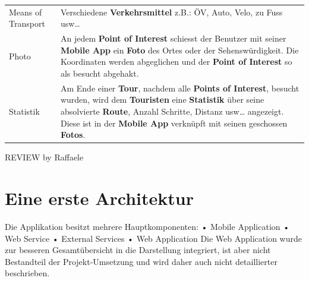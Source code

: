 \documentclass[a4paper,10pt,xetex]{article}
\begin{document}
\begin{longtable}[]{@{}ll@{}}
\begin{minipage}[t]{0.08\columnwidth}\raggedright\strut
Means of Transport\strut
\end{minipage} & \begin{minipage}[t]{0.86\columnwidth}\raggedright\strut
Verschiedene \textbf{Verkehrsmittel} z.B.: ÖV, Auto, Velo, zu Fuss
usw\ldots{}\strut
\end{minipage}\tabularnewline
\begin{minipage}[t]{0.08\columnwidth}\raggedright\strut
Photo\strut
\end{minipage} & \begin{minipage}[t]{0.86\columnwidth}\raggedright\strut
An jedem \textbf{Point of Interest} schiesst der Benutzer mit seiner
\textbf{Mobile App} ein \textbf{Foto} des Ortes oder der
Sehenswürdigkeit. Die Koordinaten werden abgeglichen und der
\textbf{Point of Interest} so als besucht abgehakt.\strut
\end{minipage}\tabularnewline
\begin{minipage}[t]{0.08\columnwidth}\raggedright\strut
Statistik\strut
\end{minipage} & \begin{minipage}[t]{0.86\columnwidth}\raggedright\strut
Am Ende einer \textbf{Tour}, nachdem alle \textbf{Points of Interest},
besucht wurden, wird dem \textbf{Touristen} eine \textbf{Statistik} über
seine absolvierte \textbf{Route}, Anzahl Schritte, Distanz usw\ldots{}
angezeigt. Diese ist in der \textbf{Mobile App} verknüpft mit seinen
geschossen \textbf{Fotos}.\strut
\end{minipage}\tabularnewline
\bottomrule
\end{longtable}

\newpage

REVIEW by Raffaele

\section{Eine erste Architektur}\label{eine-erste-architektur}

Die Applikation besitzt mehrere Hauptkomponenten: • Mobile Application •
Web Service • External Services • Web Application Die Web Application
wurde zur besseren Gesamtübersicht in die Darstellung integriert, ist
aber nicht Bestandteil der Projekt-Umsetzung und wird daher auch nicht
detaillierter beschrieben.
\end{document}
